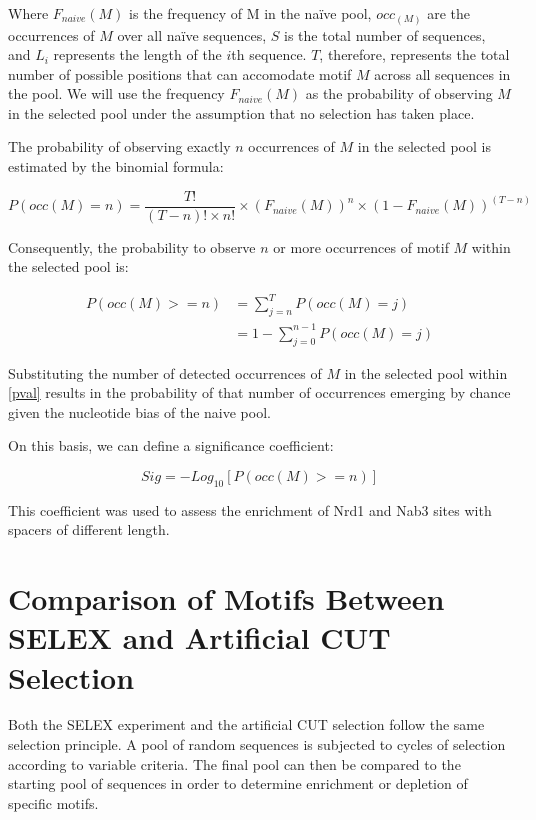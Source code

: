 Where $F_{naive}(M)$ is the frequency of M in the na\"{i}ve pool, $occ_(M)$ are the occurrences of $M$ over all na\"{i}ve sequences, $S$ is the total number of  sequences, and $L_i$ represents the length of the $i$th sequence. $T$, therefore, represents the total number of possible positions that can accomodate motif $M$ across all sequences in the pool. We will use the frequency $F_{naive}(M)$ as the probability of observing $M$ in the selected pool under the assumption that no selection has taken place.


The probability of observing exactly $n$ occurrences of $M$ in the selected pool is estimated by the binomial formula:

\begin{equation}
P(occ(M)=n) = \dfrac{T!}{(T-n)! \times n!} \times (F_{naive}(M))^n \times (1-F_{naive}(M))^{(T-n)}
\end{equation}

Consequently, the probability to observe $n$ or more occurrences of motif $M$ within the selected pool is:

\begin{equation} \label{pval}
\begin{split}
P(occ(M) >= n) & = \sum_{j=n}^{T}P(occ(M) = j)\\
& = 1-\sum_{j=0}^{n-1}P(occ(M) = j)
\end{split}
\end{equation}

Substituting the number of detected occurrences of $M$ in the selected pool  within \ref{pval} results in the probability of that number of occurrences emerging by chance given the nucleotide bias of the naive pool. 



On this basis, we can define a significance coefficient:

\begin{equation}
Sig = -Log_{10}[P(occ(M) >= n)]
\end{equation}

This coefficient was used to assess the enrichment of Nrd1 and Nab3 sites with spacers of different length.

\singlespacing
\section*{Comparison of Motifs Between SELEX and Artificial CUT Selection}
\doublespacing

Both the SELEX experiment and the artificial CUT selection follow the same selection principle. A pool of random sequences is subjected to cycles of selection according to variable criteria. The final pool can then be compared to the starting pool of sequences in order to determine enrichment or depletion of specific motifs. 

